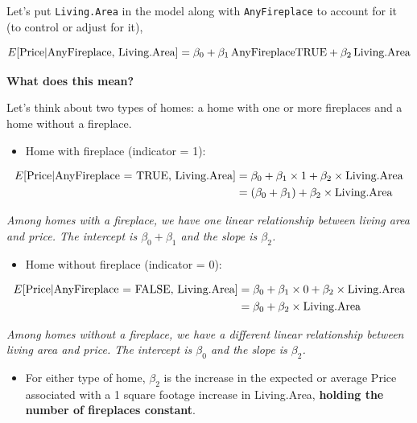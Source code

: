 \documentclass[
]{book}
\providecommand{\tightlist}{%
  \setlength{\itemsep}{0pt}\setlength{\parskip}{0pt}}
\begin{document}
Let's put \texttt{Living.Area} in the model along with \texttt{AnyFireplace} to account for it (to control or adjust for it),

\[E[\hbox{Price} | \hbox{AnyFireplace, Living.Area}] = \beta_0 + \beta_1\,\hbox{AnyFireplaceTRUE} + \beta_2\,\hbox{Living.Area}\]

\textbf{What does this mean?}

Let's think about two types of homes: a home with one or more fireplaces and a home without a fireplace.

\begin{itemize}
\tightlist
\item
  Home with fireplace (indicator = 1):
\end{itemize}

\begin{align*}
E[\hbox{Price}| \hbox{AnyFireplace = TRUE, Living.Area}] &= \beta_0 + \beta_1 \times 1 + \beta_2 \times \hbox{Living.Area} \\
&= (\beta_0 + \beta_1 ) + \beta_2 \times \hbox{Living.Area}
\end{align*}

\emph{Among homes with a fireplace, we have one linear relationship between living area and price. The intercept is \(\beta_0+\beta_1\) and the slope is \(\beta_2\).}

\begin{itemize}
\tightlist
\item
  Home without fireplace (indicator = 0):
\end{itemize}

\begin{align*}
E[\hbox{Price}| \hbox{AnyFireplace = FALSE, Living.Area}] &= \beta_0 + \beta_1 \times 0 + \beta_2 \times \hbox{Living.Area} \\
&= \beta_0 + \beta_2 \times \hbox{Living.Area}
\end{align*}

\emph{Among homes without a fireplace, we have a different linear relationship between living area and price. The intercept is \(\beta_0\) and the slope is \(\beta_2\).}

\begin{itemize}
\tightlist
\item
  For either type of home, \(\beta_2\) is the increase in the expected or average Price associated with a 1 square footage increase in Living.Area, \textbf{holding the number of fireplaces constant}.
\end{itemize}
\end{document}
